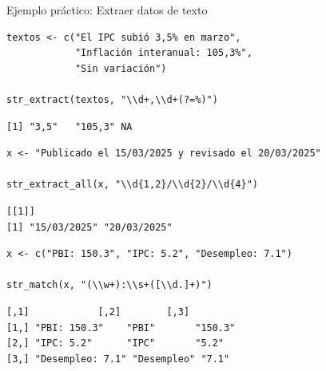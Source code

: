 \documentclass[8pt]{beamer}
\begin{document}
\begin{frame}[fragile]{Ejemplo práctico: Extraer datos de texto}
\begin{lstlisting}[style=RScript]
textos <- c("El IPC subió 3,5% en marzo",
            "Inflación interanual: 105,3%",
            "Sin variación")

str_extract(textos, "\\d+,\\d+(?=%)")
\end{lstlisting}
\begin{lstlisting}[style=RConsole]
[1] "3,5"   "105,3" NA
\end{lstlisting}

\begin{lstlisting}[style=RScript]
x <- "Publicado el 15/03/2025 y revisado el 20/03/2025"

str_extract_all(x, "\\d{1,2}/\\d{2}/\\d{4}")
\end{lstlisting}
\begin{lstlisting}[style=RConsole]
[[1]]
[1] "15/03/2025" "20/03/2025"
\end{lstlisting}
\end{frame}




\begin{frame}[fragile]
\begin{lstlisting}[style=RScript]
x <- c("PBI: 150.3", "IPC: 5.2", "Desempleo: 7.1")

str_match(x, "(\\w+):\\s+([\\d.]+)")
\end{lstlisting}
\begin{lstlisting}[style=RConsole]
		 [,1]            [,2]        [,3]
[1,] "PBI: 150.3"    "PBI"       "150.3"
[2,] "IPC: 5.2"      "IPC"       "5.2"
[3,] "Desempleo: 7.1" "Desempleo" "7.1"
\end{lstlisting}
\end{frame}
\end{document}

